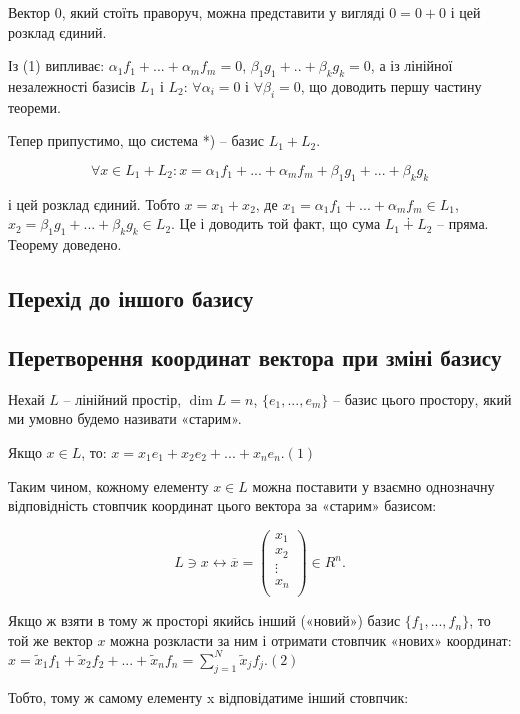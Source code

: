 Вектор 0, який стоїть праворуч, можна представити у вигляді $0 = 0 + 0$ і цей
розклад єдиний.

Із (1) випливає: $\alpha_1 f_1 + ... + \alpha_m f_m = 0$, $\beta_1 g_1 + .. + \beta_k g_k = 0$,
а із лінійної незалежності базисів $L_1$ і $L_2$: $\forall \alpha_i = 0$ і $\forall \beta_i = 0$,
що доводить першу частину теореми.

Тепер припустимо, що система *) -- базис $L_1 + L_2$.

$$\forall x \in L_1 + L_2: x = \alpha_1 f_1 + ... + \alpha_m f_m + \beta_1 g_1 + ... + \beta_k g_k$$

і цей розклад єдиний. Тобто $x = x_1 + x_2$, де $x_1 = \alpha_1 f_1 + ... + \alpha_m f_m \in L_1$,
$x_2 = \beta_1 g_1 + ... + \beta_k g_k \in L_2$. Це і доводить той факт, що сума $L_1 \dotplus L_2$ -- пряма.
Теорему доведено. 

\subsection{Перехід до іншого базису}

\subsection*{Перетворення координат вектора при зміні базису}

Нехай $L$ -- лінійний простір, $\dim L = n$, $\{e_1, ..., e_m\}$ -- базис цього простору,
який ми умовно будемо називати «старим».

Якщо $x \in L$, то: $x = x_1 e_1 + x_2 e_2 + ... + x_n e_n. (1)$

Таким чином, кожному елементу $x \in L$ можна поставити у взаємно
однозначну відповідність стовпчик координат цього вектора за «старим»
базисом:

$$L \ni x \leftrightarrow \overline{x} = \begin{pmatrix}
	x_1 \\
	x_2 \\
	\vdots \\
	x_n \\
\end{pmatrix} \in R^n.$$

Якщо ж взяти в тому ж просторі якийсь інший («новий») базис
$\{f_1, ..., f_n\}$, то той же вектор $x$ можна розкласти за ним і отримати стовпчик
«нових» координат: $x = \tilde{x}_1 f_1 + \tilde{x}_2 f_2 + ... + \tilde{x}_n f_n = \sum\limits_{j=1}^N \tilde{x}_j f_j. (2)$

Тобто, тому ж самому елементу x відповідатиме інший стовпчик:

